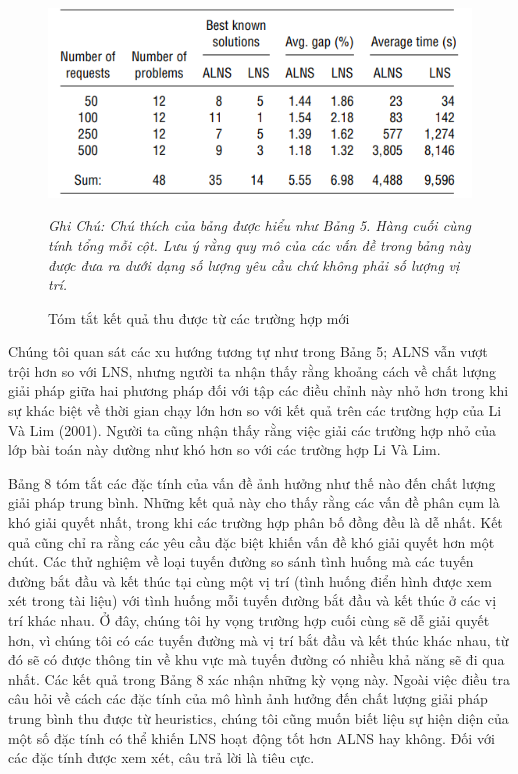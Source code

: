 \begin{center}
    \begin{figure}[htp]
    \caption{Tóm tắt kết quả thu được từ các trường hợp mới}        
    \begin{center}
     \includegraphics[scale=.6]{figures/Thuy_table6}
    \end{center}
  \textit{Ghi Chú: Chú thích của bảng được hiểu như Bảng 5. Hàng cuối cùng tính tổng mỗi cột. Lưu ý rằng quy mô của các vấn đề trong bảng này được đưa ra dưới dạng số lượng yêu cầu chứ không phải số lượng vị trí.}
    \end{figure}
\end{center}

Chúng tôi quan sát các xu hướng tương tự như trong Bảng 5; ALNS vẫn vượt trội hơn so với LNS, nhưng người ta nhận thấy rằng khoảng cách về chất lượng giải pháp giữa hai phương pháp đối với tập các điều chỉnh này nhỏ hơn trong khi sự khác biệt về thời gian chạy lớn hơn so với kết quả trên các trường hợp của Li Và Lim (2001). Người ta cũng nhận thấy rằng việc giải các trường hợp nhỏ của lớp bài toán này dường như khó hơn so với các trường hợp Li Và Lim.

Bảng 8 tóm tắt các đặc tính của vấn đề ảnh hưởng như thế nào đến chất lượng giải pháp trung bình. Những kết quả này cho thấy rằng các vấn đề phân cụm là khó giải quyết nhất, trong khi các trường hợp phân bố đồng đều là dễ nhất. Kết quả cũng chỉ ra rằng các yêu cầu đặc biệt khiến vấn đề khó giải quyết hơn một chút. Các thử nghiệm về loại tuyến đường so sánh tình huống mà các tuyến đường bắt đầu và kết thúc tại cùng một vị trí (tình huống điển hình được xem xét trong tài liệu) với tình huống mỗi tuyến đường bắt đầu và kết thúc ở các vị trí khác nhau. Ở đây, chúng tôi hy vọng trường hợp cuối cùng sẽ dễ giải quyết hơn, vì chúng tôi có các tuyến đường mà vị trí bắt đầu và kết thúc khác nhau, từ đó sẽ có được thông tin về khu vực mà tuyến đường có nhiều khả năng sẽ đi qua nhất. Các kết quả trong Bảng 8 xác nhận những kỳ vọng này.
Ngoài việc điều tra câu hỏi về cách các đặc tính của mô hình ảnh hưởng đến chất lượng giải pháp trung bình thu được từ heuristics, chúng tôi cũng muốn biết liệu sự hiện diện của một số đặc tính có thể khiến LNS hoạt động tốt hơn ALNS hay không. Đối với các đặc tính được xem xét, câu trả lời là tiêu cực.

